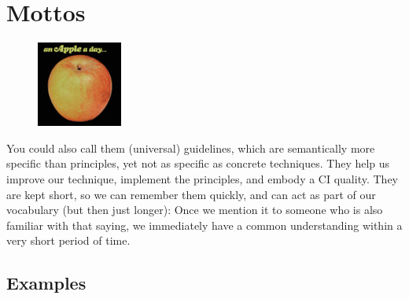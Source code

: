 \section{Mottos}\label{sec:mottos}

\begin{figure}
    \centering
    \includegraphics[width=0.25\textwidth]{images/mottos}
\end{figure}

You could also call them (universal) guidelines, which are semantically more specific than principles, yet not as specific as concrete techniques.
They help us improve our technique, implement the principles, and embody a CI quality.
They are kept short, so we can remember them quickly, and can act as part of our vocabulary (but then just longer):
Once we mention it to someone who is also familiar with that saying, we immediately have a common understanding within a very short period of time.

\subsection{Examples}\label{subsec:examples}

